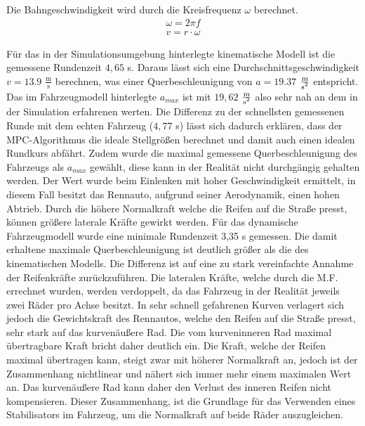 \documentclass{like}
\begin{document}
Die Bahngeschwindigkeit wird durch die Kreisfrequenz $\omega$ berechnet.
\begin{eqnarray}
	 \omega = 2 \pi f \\
	 v = r \cdot \omega
\end{eqnarray}


Für das in der Simulationsumgebung hinterlegte kinematische Modell ist die gemessene Rundenzeit $4,65$ s. Daraus lässt sich eine Durchschnittsgeschwindigkeit $ v= 13.9$ $ \frac{\text{m}}{\text{s}}$ berechnen, was einer Querbeschleunigung von $a = 19.37$ $ \frac{\text{m}}{\text{s\textsuperscript{2}}}$ entspricht. Das im Fahrzeugmodell hinterlegte $a_{max}$ ist mit $19,62$ $ \frac{\text{m}}{\text{s\textsuperscript{2}}}$ also sehr nah an dem in der Simulation erfahrenen werten. Die Differenz zu der schnellsten gemessenen Runde mit dem echten Fahrzeug ($4,77$ s) lässt sich dadurch erklären, dass der MPC-Algorithmus die ideale Stellgrößen berechnet und damit auch einen idealen Rundkurs abfährt. Zudem wurde die maximal gemessene Querbeschleunigung des Fahrzeugs als $a_{max}$ gewählt, diese kann in der Realität nicht durchgängig gehalten werden. Der Wert wurde beim Einlenken mit hoher Geschwindigkeit ermittelt, in diesem Fall besitzt das Rennauto, aufgrund seiner Aerodynamik, einen hohen Abtrieb. Durch die höhere Normalkraft welche die Reifen auf die Straße presst, können größere laterale Kräfte gewirkt werden.
Für das dynamische Fahrzeugmodell wurde eine minimale Rundenzeit 3,35 s gemessen.  Die damit erhaltene maximale Querbeschleunigung ist deutlich größer als die des kinematischen Modells. Die Differenz ist auf eine zu stark vereinfachte Annahme der Reifenkräfte zurückzuführen. Die lateralen Kräfte, welche durch die \ac{M.F.} errechnet wurden, werden verdoppelt, da das Fahrzeug in der Realität jeweils zwei Räder pro Achse besitzt. In sehr schnell gefahrenen Kurven verlagert sich jedoch die Gewichtskraft des Rennautos, welche den Reifen auf die Straße presst, sehr stark auf das kurvenäußere Rad. Die vom kurveninneren Rad maximal übertragbare Kraft bricht daher deutlich ein. Die Kraft, welche der Reifen maximal übertragen kann, steigt zwar mit höherer Normalkraft an, jedoch ist der Zusammenhang nichtlinear und nähert sich immer mehr einem maximalen Wert an. Das kurvenäußere Rad kann daher den Verlust des inneren Reifen nicht kompensieren. Dieser Zusammenhang, ist die Grundlage für das Verwenden eines Stabilisators im Fahrzeug, um die Normalkraft auf beide Räder auszugleichen.
\end{document}

